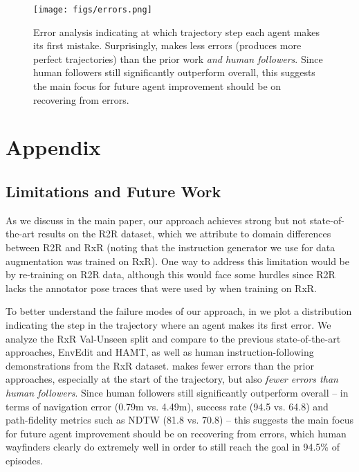 

\begin{figure*}[h]
  \centering
  \texttt{[image: figs/errors.png]}
  \vspace{-2mm}
  \caption{Error analysis indicating at which trajectory step each agent makes its first mistake. Surprisingly, \ModelName{} makes less errors (produces more perfect trajectories) than the prior work \textit{and human followers}. Since human followers still significantly outperform \ModelName{} overall, this suggests the main focus for future agent improvement should be on recovering from errors.}
  \label{fig:errors}
\end{figure*}

\appendix

\section{Appendix}


\subsection{Limitations and Future Work}

As we discuss in the main paper, our approach achieves strong but not state-of-the-art results on the R2R dataset, which
we attribute to domain differences between R2R and RxR (noting that the \Marky{} instruction generator we use for data augmentation was trained on RxR). One way to address this limitation would be by re-training \Marky{} on R2R data, although this would face some hurdles since R2R lacks the annotator pose traces that were used by \Marky{} when training on RxR. 

To better understand the failure modes of our approach, in  we plot a distribution indicating the step in the trajectory where an agent makes its first error. We analyze the RxR Val-Unseen split and compare \ModelName{} to the previous state-of-the-art approaches, EnvEdit and HAMT, as well as human instruction-following demonstrations from the RxR dataset. \ModelName{} makes fewer errors than the prior approaches, especially at the start of the trajectory, but also \textit{fewer errors than human followers}. Since human followers still significantly outperform \ModelName{} overall -- in terms of navigation error (0.79m vs. 4.49m), success rate (94.5 vs. 64.8) and path-fidelity metrics such as NDTW (81.8 vs. 70.8) -- this suggests the main focus for future agent improvement should be on recovering from errors, which human wayfinders clearly do extremely well in order to still reach the goal in 94.5\% of episodes.



